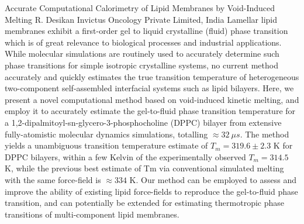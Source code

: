 
    \begin{abstract_online}{Accurate Computational Calorimetry of Lipid Membranes by Void-Induced Melting }{%
        R. Desikan}{%
        \IStag}{%
        Invictus Oncology Private Limited, India}
    Lamellar lipid membranes exhibit a first-order gel to liquid crystalline (fluid) phase transition which is of great relevance to biological processes and industrial applications. While molecular simulations are routinely used to accurately determine such phase transitions for simple isotropic crystalline systems, no current method accurately and quickly estimates the true transition temperature of heterogeneous two-component self-assembled interfacial systems such as lipid bilayers. Here, we present a novel computational method based on void-induced kinetic melting, and employ it to accurately estimate the gel-to-fluid phase transition temperature for a 1,2-dipalmitoyl-sn-glycero-3-phosphocholine (DPPC) bilayer from extensive fully-atomistic molecular dynamics simulations, totalling $\approx 32 \ \mu s$. The method yields a unambiguous transition temperature estimate of $T_m = 319.6 \pm 2.3$ K for DPPC bilayers, within a few Kelvin of the experimentally observed $T_m = 314.5$ K, while the previous best estimate of Tm via conventional simulated melting with the same force-field is $\approx 334$ K. Our method can be employed to assess and improve the ability of existing lipid force-fields to reproduce the gel-to-fluid phase transition, and can potentially be extended for estimating thermotropic phase transitions of multi-component lipid membranes. 
    
    \end{abstract_online}
    
